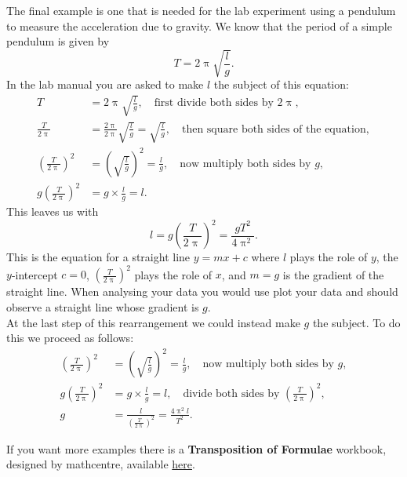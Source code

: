 \documentclass[a4paper,12pt]{book}
\begin{document}
The final example is one that is needed for the lab experiment using a pendulum to measure the acceleration due to gravity. We know that the period of a simple pendulum is given by
\begin{equation*}
T=2\uppi\sqrt{\frac{l}{g}}.
\end{equation*}
In the lab manual you are asked to make $l$ the subject of this equation:
\begin{align*}
T&=2\uppi\sqrt{\frac{l}{g}}, \quad \text{first divide both sides by $2\uppi$},\\
\frac{T}{2\uppi}&=\frac{2\uppi}{2\uppi}\sqrt{\frac{l}{g}}=\sqrt{\frac{l}{g}}, \quad \text{then square both sides of the equation},\\
\left(\frac{T}{2\uppi}\right)^{2}&=\left(\sqrt{\frac{l}{g}}\right)^{2}=\frac{l}{g}, \quad \text{now multiply both sides by $g$},\\
g\left(\frac{T}{2\uppi}\right)^{2}&=g\times\frac{l}{g}=l.
\end{align*}
This leaves us with
\begin{equation*}
l=g\left(\frac{T}{2\uppi}\right)^{2}=\frac{gT^{2}}{4\uppi^{2}}.
\end{equation*}
This is the equation for a straight line $y=mx+c$ where $l$ plays the role of $y$, the $y$-intercept $c=0$, $\left(\frac{T}{2\uppi}\right)^{2}$ plays the role of $x$, and $m=g$ is the gradient of the straight line. When analysing your data you would use plot your data and should observe a straight line whose gradient is $g$.\\

At the last step of this rearrangement we could instead make $g$ the subject. To do this we proceed as follows:
\begin{align*}
\left(\frac{T}{2\uppi}\right)^{2}&=\left(\sqrt{\frac{l}{g}}\right)^{2}=\frac{l}{g}, \quad \text{now multiply both sides by $g$},\\
g\left(\frac{T}{2\uppi}\right)^{2}&=g\times \frac{l}{g}=l, \quad \text{divide both sides by }\left(\frac{T}{2\uppi}\right)^{2}, \\
g&=\frac{l}{\left(\frac{T}{2\uppi}\right)^{2}}=\frac{4\uppi^{2} l}{T^{2}}.
\end{align*}

If you want more examples there is a \textbf{Transposition of Formulae} workbook, designed by mathcentre,  available \href{https://www.mathcentre.ac.uk/resources/uploaded/mc-ty-transposition-2009-1.pdf}{here}.


\end{document}

